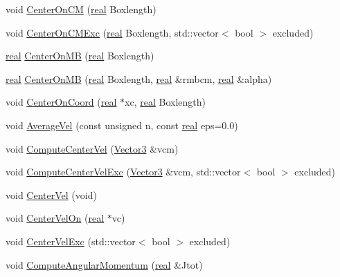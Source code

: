 \begin{DoxyCompactItemize}
void \hyperlink{classHaloProperties_a4a3489a22ccd05f8d1119d4a2337d053}{CenterOnCM} (\hyperlink{Global_8h_a031f8951175b43076c2084a6c2173410}{real} Boxlength)
\item 
void \hyperlink{classHaloProperties_a9149e0a3d5ca614566b15e4d0bf59e96}{CenterOnCMExc} (\hyperlink{Global_8h_a031f8951175b43076c2084a6c2173410}{real} Boxlength, std::vector$<$ bool $>$ excluded)
\item 
\hyperlink{Global_8h_a031f8951175b43076c2084a6c2173410}{real} \hyperlink{classHaloProperties_a93804911ced0f2b51e08626f8b4f914a}{CenterOnMB} (\hyperlink{Global_8h_a031f8951175b43076c2084a6c2173410}{real} Boxlength)
\item 
\hyperlink{Global_8h_a031f8951175b43076c2084a6c2173410}{real} \hyperlink{classHaloProperties_a3234a91e6ce19248e9a5523af439fe25}{CenterOnMB} (\hyperlink{Global_8h_a031f8951175b43076c2084a6c2173410}{real} Boxlength, \hyperlink{Global_8h_a031f8951175b43076c2084a6c2173410}{real} \&rmbcm, \hyperlink{Global_8h_a031f8951175b43076c2084a6c2173410}{real} \&alpha)
\item 
void \hyperlink{classHaloProperties_ade9b254c05fdc9b71cb3f93933774157}{CenterOnCoord} (\hyperlink{Global_8h_a031f8951175b43076c2084a6c2173410}{real} $\ast$xc, \hyperlink{Global_8h_a031f8951175b43076c2084a6c2173410}{real} Boxlength)
\item 
void \hyperlink{classHaloProperties_abcee0f6284cf4991bf89cc6aafd84f60}{AverageVel} (const unsigned n, const \hyperlink{Global_8h_a031f8951175b43076c2084a6c2173410}{real} eps=0.0)
\item 
void \hyperlink{classHaloProperties_a1537fda3a25fcde3db6d16bd8ee150b6}{ComputeCenterVel} (\hyperlink{classVector3}{Vector3} \&vcm)
\item 
void \hyperlink{classHaloProperties_aaf32e9b882dc42e50c5609db83aa4778}{ComputeCenterVelExc} (\hyperlink{classVector3}{Vector3} \&vcm, std::vector$<$ bool $>$ excluded)
\item 
void \hyperlink{classHaloProperties_ab8ca12ff57d1ed55feedb3a287136745}{CenterVel} (void)
\item 
void \hyperlink{classHaloProperties_a1584267a0d3b6f3469bad5ead7428b94}{CenterVelOn} (\hyperlink{Global_8h_a031f8951175b43076c2084a6c2173410}{real} $\ast$vc)
\item 
void \hyperlink{classHaloProperties_ab5b9df653b5053ef445381c38bd1940c}{CenterVelExc} (std::vector$<$ bool $>$ excluded)
\item 
void \hyperlink{classHaloProperties_a61d17e98fb59a269786264cd41746720}{ComputeAngularMomentum} (\hyperlink{Global_8h_a031f8951175b43076c2084a6c2173410}{real} \&Jtot)

\end{DoxyCompactItemize}
